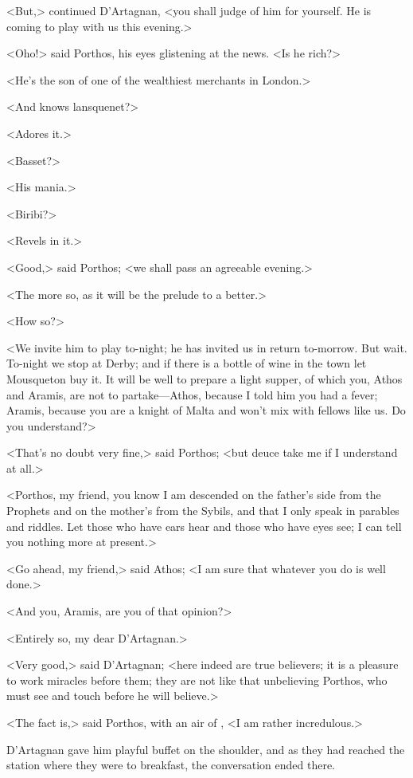 <But,> continued D'Artagnan, <you shall judge of him for yourself. He is coming to play with us this evening.>

<Oho!> said Porthos, his eyes glistening at the news. <Is he rich?>

<He's the son of one of the wealthiest merchants in London.>

<And knows lansquenet?>

<Adores it.>

<Basset?>

<His mania.>

<Biribi?>

<Revels in it.>

<Good,> said Porthos; <we shall pass an agreeable evening.>

<The more so, as it will be the prelude to a better.>

<How so?>

<We invite him to play to-night; he has invited us in return to-morrow. But wait. To-night we stop at Derby; and if there is a bottle of wine in the town let Mousqueton buy it. It will be well to prepare a light supper, of which you, Athos and Aramis, are not to partake—Athos, because I told him you had a fever; Aramis, because you are a knight of Malta and won't mix with fellows like us. Do you understand?>

<That's no doubt very fine,> said Porthos; <but deuce take me if I understand at all.>

<Porthos, my friend, you know I am descended on the father's side from the Prophets and on the mother's from the Sybils, and that I only speak in parables and riddles. Let those who have ears hear and those who have eyes see; I can tell you nothing more at present.>

<Go ahead, my friend,> said Athos; <I am sure that whatever you do is well done.>

<And you, Aramis, are you of that opinion?>

<Entirely so, my dear D'Artagnan.>

<Very good,> said D'Artagnan; <here indeed are true believers; it is a pleasure to work miracles before them; they are not like that unbelieving Porthos, who must see and touch before he will believe.>

<The fact is,> said Porthos, with an air of , <I am rather incredulous.>

D'Artagnan gave him playful buffet on the shoulder, and as they had reached the station where they were to breakfast, the conversation ended there.

